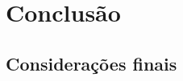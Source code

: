 \documentclass[
	12pt,				%
	openright,			%
	twoside,			%
	a4paper,			%
	english,			%
	brazil				%
	]{abntex2}
\begin{document}
\part{Conclusão}


\chapter*[Considerações finais]{Considerações finais}

\lipsum[31-33]

\postextual



%
%




\end{document}
